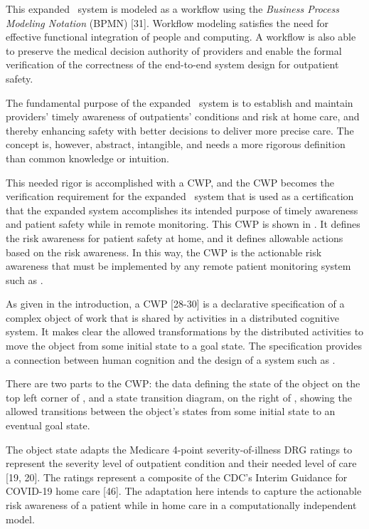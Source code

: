 This expanded \phware\ system is modeled as a workflow using the \emph{Business Process Modeling Notation} (BPMN) [31]. Workflow modeling satisfies the need for effective functional integration of people and computing. A workflow is also able to preserve the medical decision authority of providers and enable the formal verification of the correctness of the end-to-end system design for outpatient safety.

The fundamental purpose of the expanded \phware\ system is to establish and maintain providers' timely awareness of outpatients' conditions and risk at home care, and thereby enhancing safety with better decisions to deliver more precise care. The concept is, however, abstract, intangible, and needs a more rigorous definition than common knowledge or intuition. 

This needed rigor is accomplished with a CWP, and the CWP becomes the verification requirement for the expanded \phware\ system that is used as a certification that the expanded system accomplishes its intended purpose of timely awareness and patient safety while in remote monitoring. This CWP is shown in . It defines the risk awareness for patient safety at home, and it defines allowable actions based on the risk awareness. In this way, the CWP is the actionable risk awareness that must be implemented by any remote patient monitoring system such as \phware. 

As given in the introduction, a CWP [28-30] is a declarative specification of a complex object of work that is shared by activities in a distributed cognitive system. It makes clear the allowed transformations by the distributed activities to move the object from some initial state to a goal state. The specification provides a connection between human cognition and the design of a system such as \phware.

There are two parts to the CWP: the data defining the state of the object on the top left corner of , and a state transition diagram, on the right of , showing the allowed transitions between the object's states from some initial state to an eventual goal state. 

The object state adapts the Medicare 4-point severity-of-illness DRG ratings to represent the severity level of outpatient condition and their needed level of care [19, 20]. The ratings represent a composite of the CDC’s Interim Guidance for COVID-19 home care [46]. The adaptation here intends to capture the actionable risk awareness of a patient while in home care in a computationally independent model. 

